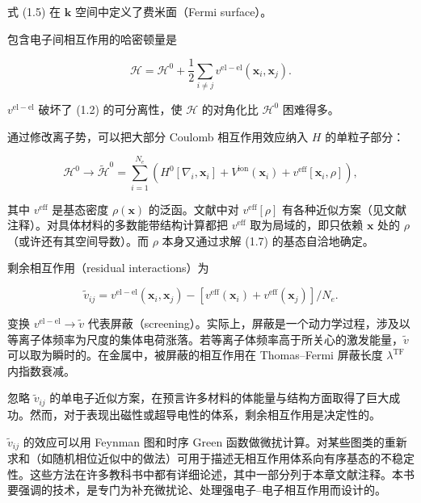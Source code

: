 式 (1.5) 在 $\mathbf{k}$ 空间中定义了费米面（Fermi surface）。

包含电子间相互作用的哈密顿量是

\begin{equation*}
\mathcal {H} = \mathcal {H} ^ {0} + \frac {1}{2} \sum_ {i \neq j} v ^ {\mathrm{el-el}} (\mathbf {x} _ {i}, \mathbf {x} _ {j}).
\tag{1.6}
\end{equation*}

$v^{\mathrm{el-el}}$ 破坏了 (1.2) 的可分离性，使 $\mathcal{H}$ 的对角化比 $\mathcal{H}^0$ 困难得多。

通过修改离子势，可以把大部分 Coulomb 相互作用效应纳入 $H$ 的单粒子部分：

\begin{equation*}
\mathcal {H} ^ {0} \rightarrow \tilde {\mathcal {H}} ^ {0} = \sum_ {i = 1} ^ {N _ {e}} \left( H ^ {0} [ \nabla_ {i}, \mathbf {x} _ {i} ] + V ^ {\mathrm{ion}} (\mathbf {x} _ {i}) + v ^ {\mathrm{eff}} [ \mathbf {x} _ {i}, \rho ] \right),
\tag{1.7}
\end{equation*}

其中 $v^{\mathrm{eff}}$ 是基态密度 $\rho(\mathbf{x})$ 的泛函。文献中对 $v^{\mathrm{eff}}[\rho]$ 有各种近似方案（见文献注释）。对具体材料的多数能带结构计算都把 $v^{\mathrm{eff}}$ 取为局域的，即只依赖 $\mathbf{x}$ 处的 $\rho$（或许还有其空间导数）。而 $\rho$ 本身又通过求解 (1.7) 的基态自洽地确定。

剩余相互作用（residual interactions）为

\begin{equation*}
\tilde {v} _ {ij} = v ^ {\mathrm{el-el}} (\mathbf {x} _ {i}, \mathbf {x} _ {j}) - \left[ v ^ {\mathrm{eff}} (\mathbf {x} _ {i}) + v ^ {\mathrm{eff}} (\mathbf {x} _ {j}) \right] / N _ {e}.
\tag{1.8}
\end{equation*}

变换 $v^{\mathrm{el-el}} \to \tilde{v}$ 代表屏蔽（screening）。实际上，屏蔽是一个动力学过程，涉及以等离子体频率为尺度的集体电荷涨落。若等离子体频率高于所关心的激发能量，$\tilde{v}$ 可以取为瞬时的。在金属中，被屏蔽的相互作用在 Thomas--Fermi 屏蔽长度 $\lambda^{\mathrm{TF}}$ 内指数衰减。

忽略 $\tilde{v}_{ij}$ 的单电子近似方案，在预言许多材料的体能量与结构方面取得了巨大成功。然而，对于表现出磁性或超导电性的体系，剩余相互作用是决定性的。

$\tilde{v}_{ij}$ 的效应可以用 Feynman 图和时序 Green 函数做微扰计算。对某些图类的重新求和（如随机相位近似中的做法）可用于描述无相互作用体系向有序基态的不稳定性。这些方法在许多教科书中都有详细论述，其中一部分列于本章文献注释。本书要强调的技术，是专门为补充微扰论、处理强电子--电子相互作用而设计的。

